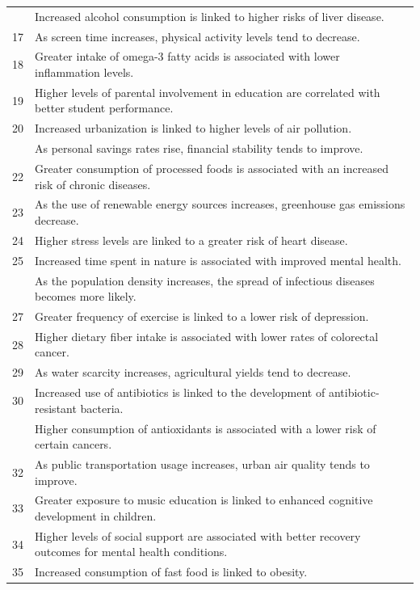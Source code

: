 \documentclass[
  letterpaper,
  DIV=11,
  numbers=noendperiod]{scrartcl}
\begin{document}
\begin{longtable}[t]{r>{\raggedright\arraybackslash}p{35em}}
\addlinespace
16 & Increased alcohol consumption is linked to higher risks of liver disease.\\
17 & As screen time increases, physical activity levels tend to decrease.\\
18 & Greater intake of omega-3 fatty acids is associated with lower inflammation levels.\\
19 & Higher levels of parental involvement in education are correlated with better student performance.\\
20 & Increased urbanization is linked to higher levels of air pollution.\\
\addlinespace
21 & As personal savings rates rise, financial stability tends to improve.\\
22 & Greater consumption of processed foods is associated with an increased risk of chronic diseases.\\
23 & As the use of renewable energy sources increases, greenhouse gas emissions decrease.\\
24 & Higher stress levels are linked to a greater risk of heart disease.\\
25 & Increased time spent in nature is associated with improved mental health.\\
\addlinespace
26 & As the population density increases, the spread of infectious diseases becomes more likely.\\
27 & Greater frequency of exercise is linked to a lower risk of depression.\\
28 & Higher dietary fiber intake is associated with lower rates of colorectal cancer.\\
29 & As water scarcity increases, agricultural yields tend to decrease.\\
30 & Increased use of antibiotics is linked to the development of antibiotic-resistant bacteria.\\
\addlinespace
31 & Higher consumption of antioxidants is associated with a lower risk of certain cancers.\\
32 & As public transportation usage increases, urban air quality tends to improve.\\
33 & Greater exposure to music education is linked to enhanced cognitive development in children.\\
34 & Higher levels of social support are associated with better recovery outcomes for mental health conditions.\\
35 & Increased consumption of fast food is linked to obesity.\\

\end{longtable}
\end{document}
